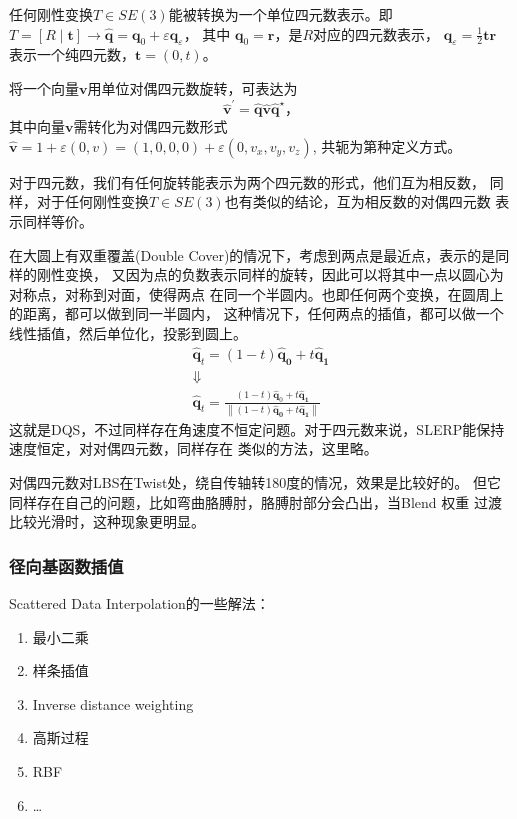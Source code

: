 \documentclass[lang=cn,newtx,10pt,scheme=chinese]{elegantbook}
\begin{document}
\begin{theorem}
  任何刚性变换$T\in SE(3)$能被转换为一个单位四元数表示。即
$
T=[R \mid \boldsymbol{t}] \rightarrow \widehat{\boldsymbol{q}}=\boldsymbol{q}_0+\varepsilon \boldsymbol{q}_{\varepsilon}
$，
其中
$\boldsymbol{q}_0=\boldsymbol{r}$，是$R$对应的四元数表示，
$\boldsymbol{q}_{\varepsilon}=\frac{1}{2} \boldsymbol{t r}$ 表示一个纯四元数，$\boldsymbol{t}=(0, t)$。
\end{theorem}

将一个向量$\boldsymbol{v}$用单位对偶四元数旋转，可表达为
\begin{equation}
  \widehat{\boldsymbol{v}}^{\prime}=\widehat{\boldsymbol{q}} \widehat{\boldsymbol{v}} \widehat{\boldsymbol{q}}^{\star}，  
\end{equation}
其中向量$\boldsymbol{v}$需转化为对偶四元数形式
$ \hat{\boldsymbol{v}} =1+\varepsilon(0, v) =(1,0,0,0)+\varepsilon\left(0, v_x, v_y, v_z\right)$,
共轭为第种定义方式。

对于四元数，我们有任何旋转能表示为两个四元数的形式，他们互为相反数，
同样，对于任何刚性变换$T\in SE(3)$也有类似的结论，互为相反数的对偶四元数
表示同样等价。

在大圆上有双重覆盖(Double Cover)的情况下，考虑到两点是最近点，表示的是同样的刚性变换，
又因为点的负数表示同样的旋转，因此可以将其中一点以圆心为对称点，对称到对面，使得两点
在同一个半圆内。也即任何两个变换，在圆周上的距离，都可以做到同一半圆内，
这种情况下，任何两点的插值，都可以做一个线性插值，然后单位化，投影到圆上。
\begin{equation}
  \begin{gathered}
  \widehat{\boldsymbol{q}}_t=(1-t) \widehat{\boldsymbol{q}}_{\mathbf{0}}+t \widehat{\boldsymbol{q}}_{\mathbf{1}} \\
  \Downarrow \\
  \widehat{\boldsymbol{q}}_t=\frac{(1-t) \widehat{\boldsymbol{q}}_0+t \widehat{\boldsymbol{q}}_{\mathbf{1}}}{\left\|(1-t) \widehat{\boldsymbol{q}}_{\mathbf{0}}+t \widehat{\boldsymbol{q}}_{\mathbf{1}}\right\|}
  \end{gathered}
\end{equation}
这就是DQS，不过同样存在角速度不恒定问题。对于四元数来说，SLERP能保持速度恒定，对对偶四元数，同样存在
类似的方法，这里略。

对偶四元数对LBS在Twist处，绕自传轴转180度的情况，效果是比较好的。
但它同样存在自己的问题，比如弯曲胳膊肘，胳膊肘部分会凸出，当Blend 权重
过渡比较光滑时，这种现象更明显。

\subsubsection{径向基函数插值}
Scattered Data Interpolation的一些解法：
\begin{enumerate}
  \setlength{\itemindent}{2em}
  \item 最小二乘
  \item 样条插值
  \item Inverse distance weighting
  \item 高斯过程
  \item RBF
  \item \dots
\end{enumerate}
\end{document}

